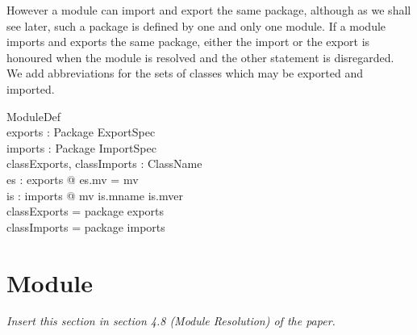 \documentclass[a4paper,9pt]{article}
\begin{document}
However a module can import and export the same package, although
as we shall see later, such a package is defined by one and only one
module.
If a module imports and exports the same package,
either the import or the
export is honoured when the module is resolved and the other statement
is disregarded.
We add abbreviations for the sets of classes which may be exported
and imported.
\begin{schema}{ModuleDef}
  \ModuleDefZero \\
  exports : Package \rel ExportSpec \\
  imports : Package \pfun ImportSpec \\
  classExports, classImports : \power ClassName \\
\where
  \forall es : \ran exports @ es.mv = mv \\
  \forall is : \ran imports @ mv \notin is.mname \cross is.mver \\
  classExports = package \inv \limg \dom exports \rimg \\
  classImports = package \inv \limg \dom imports \rimg \\
\end{schema}




\clearpage
\section{Module}
\label{cha:module}
\textit{Insert this section in section 4.8 (Module Resolution) of the paper.}
\end{document}
